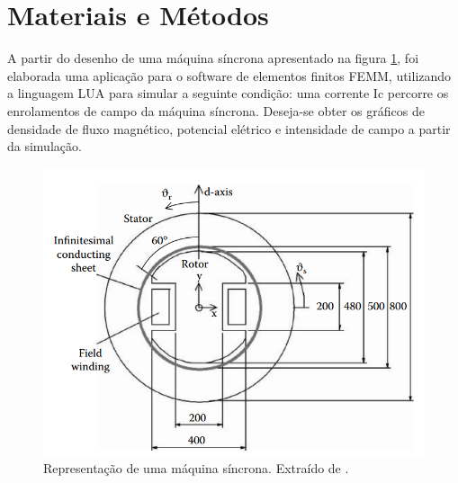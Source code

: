 \section{Materiais e Métodos}
A partir do desenho de uma máquina síncrona apresentado na figura \ref{maq_sinc_id}, foi elaborada uma aplicação para o software de elementos finitos FEMM, utilizando a linguagem LUA para simular a seguinte condição: uma corrente Ic percorre os enrolamentos de campo da máquina síncrona. Deseja-se obter os gráficos de densidade de fluxo magnético, potencial elétrico e intensidade de campo a partir da simulação.
\begin{figure}[H]
\centering
\includegraphics[scale=0.7]{img/assig4/ideal_synchronous_machine.png}
\caption[Representação de uma máquina síncrona]{Representação de uma máquina síncrona. Extraído de \cite{Bianc}.}
\label{maq_sinc_id}
\end{figure}
